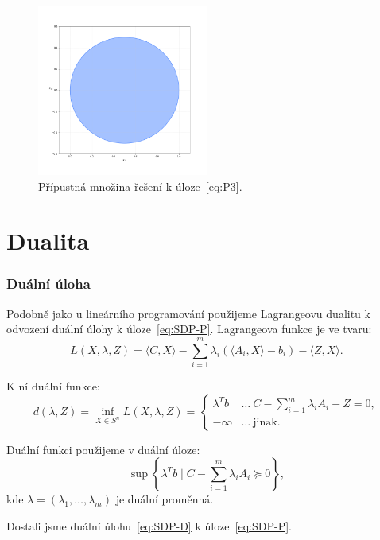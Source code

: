 \begin{figure}[h!]
    \centering
    \includegraphics[width=0.5\textwidth]{img/ex3.png}   
    \caption{Přípustná množina řešení k úloze~\ref{eq:P3}.}
    \label{fig:ex3}
\end{figure}

\section{Dualita}

\subsubsection*{Duální úloha}

Podobně jako u lineárního programování použijeme Lagrangeovu dualitu k odvození duální úlohy k úloze~\ref{eq:SDP-P}. Lagrangeova funkce je ve tvaru:
$$
    L(X, \lambda, Z) = \langle C, X \rangle - \sum_{i=1}^m \lambda_i \left( \langle A_i, X \rangle - b_i \right) - \langle Z, X \rangle.
$$

\noindent K ní duální funkce:
$$
    d(\lambda, Z) = \inf_{X \in S^n} L(X, \lambda, Z) = 
    \begin{cases}
        \lambda^T b & \dots\ C - \sum_{i=1}^m \lambda_i A_i - Z = 0, \\
        -\infty     & \dots\ \text{jinak.}
    \end{cases}
$$

\noindent Duální funkci použijeme v duální úloze:
\begin{equation}\tag{SDP-D}
    \sup\left\{ \lambda^Tb \mid C - \sum_{i=1}^m \lambda_i A_i \succeq 0 \right\},
    \label{eq:SDP-D}
\end{equation}
kde $\lambda = (\lambda_1, \dots, \lambda_m)$ je duální proměnná.

\noindent Dostali jsme duální úlohu~\ref{eq:SDP-D} k úloze~\ref{eq:SDP-P}.

